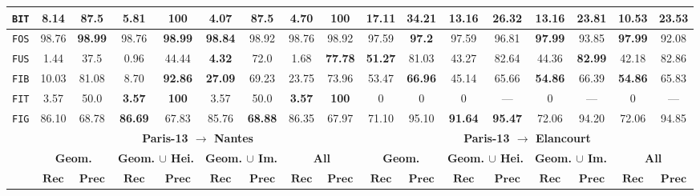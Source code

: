 \begin{sidewaystable}
\begin{center}
\begin{tabular}{|c | c c | c c | c c | c c || c c | c c | c c | c c |}
                    \hline
                    \texttt{BIT} & \textbf{8.14} & 87.5 & 5.81 & \textbf{100} & 4.07 & 87.5 & 4.70 & \textbf{100} & \textbf{17.11} & \textbf{34.21} & 13.16 & 26.32 & 13.16 & 23.81 & 10.53 & 23.53 \\
                    \hline
                    \texttt{FOS} & 98.76 & \textbf{98.99} & 98.76 & \textbf{98.99} & \textbf{98.84} & 98.92 & 98.76 & 98.92 & 97.59 & \textbf{97.2} & 97.59 & 96.81 & \textbf{97.99} & 93.85 & \textbf{97.99} & 92.08 \\
                    \hline
                    \texttt{FUS} & 1.44 & 37.5 & 0.96 & 44.44 & \textbf{4.32} & 72.0 & 1.68 & \textbf{77.78} & \textbf{51.27} & 81.03 & 43.27 & 82.64 & 44.36 & \textbf{82.99} & 42.18 & 82.86 \\
                    \hline
                    \texttt{FIB} & 10.03 & 81.08 & 8.70 & \textbf{92.86} & \textbf{27.09} & 69.23 & 23.75 & 73.96 & 53.47 & \textbf{66.96} & 45.14 & 65.66 & \textbf{54.86} & 66.39 & \textbf{54.86} & 65.83 \\
                    \hline
                    \texttt{FIT} & 3.57 & 50.0 & \textbf{3.57} & \textbf{100} & 3.57 & 50.0 & \textbf{3.57} & \textbf{100} & 0 & 0 & 0 & --- & 0 & --- & 0 & --- \\
                    \hline
                    \texttt{FIG} & 86.10 & 68.78 & \textbf{86.69} & 67.83 & 85.76 & \textbf{68.88} & 86.35 & 67.97 & 71.10 & 95.10 & \textbf{91.64} & \textbf{95.47} & 72.06 & 94.20 & 72.06 & 94.85 \\
                    \hline
                    \hline
                    & \multicolumn{8}{c||}{\textbf{Paris-13 $\rightarrow$ Nantes}} & \multicolumn{8}{c|}{\textbf{Paris-13 $\rightarrow$ Elancourt}}\\
                    \hline
                    &\multicolumn{2}{c|}{\textbf{Geom.}} & \multicolumn{2}{c|}{\textbf{Geom. $\cup$ Hei.}} & \multicolumn{2}{c|}{\textbf{Geom. $\cup$ Im.}} & \multicolumn{2}{c||}{\textbf{All}} & \multicolumn{2}{c|}{\textbf{Geom.}} & \multicolumn{2}{c|}{\textbf{Geom. $\cup$ Hei.}} & \multicolumn{2}{c|}{\textbf{Geom. $\cup$ Im.}} & \multicolumn{2}{x{1.5cm}|}{\textbf{All}}\\
                    \cline{2-17}
                    & $\bm{Rec}$ & $\bm{Prec}$ &  $\bm{Rec}$ & $\bm{Prec}$ &  $\bm{Rec}$ & $\bm{Prec}$ &  $\bm{Rec}$ & $\bm{Prec}$ & $\bm{Rec}$ & $\bm{Prec}$ &  $\bm{Rec}$ & $\bm{Prec}$ &  $\bm{Rec}$ & $\bm{Prec}$ &  $\bm{Rec}$ & $\bm{Prec}$ \\
                    \hline

\end{tabular}
\end{center}
\end{sidewaystable}
